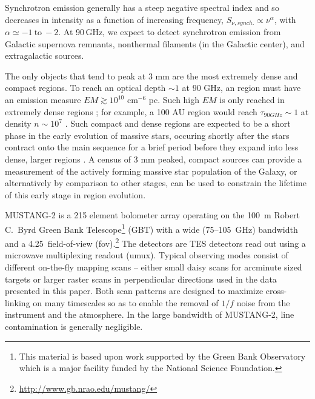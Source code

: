 \documentclass[twocolumn]{aastex62}
\newcommand{\MUSTANG}{MUSTANG-2\xspace}
\begin{document}
Synchrotron emission generally has a steep negative spectral index and so
decreases in intensity as a function of increasing frequency, $S_{\nu,
synch.}\propto \nu^{\alpha}$, with $\alpha\simeq -1 \mathrm{~to~} -2$.  At 90\,GHz, we expect
to detect synchrotron emission from Galactic supernova remnants, nonthermal
filaments (in the Galactic center), and extragalactic sources.

The only objects that tend to peak at 3 mm are the most extremely dense and
compact \hii regions.  To reach an optical depth $\sim1$ at 90 GHz, an \hii
region must have an emission measure $EM\gtrsim10^{10}$ cm$^{-6}$ pc.  Such high $EM$ is
only reached in extremely dense regions \citep[e.g.][]{Galvan-Madrid2009a}; for example, a 100 AU \hii region
would reach $\tau_{90 GHz}\sim1$ at density $n\sim10^7$ \percc
\citep[][]{Wilson2009a,Condon2016a}.  Such compact and dense \hii regions are
expected to be a short phase in the early evolution of massive stars, occuring
shortly after the stars contract onto the main sequence for a brief period
before they expand into less dense, larger \hii regions \citep{Wood1989b}.  A
census of 3 mm peaked, compact sources can provide a measurement of the
actively forming massive star population of the Galaxy, or alternatively by
comparison to other stages, can be used to constrain the lifetime of this early
stage in \hii region evolution.


\MUSTANG \citep{Dicker2014a} is a 215 element bolometer array operating on the
100~m Robert C.\ Byrd Green Bank Telescope\footnote{This material is
based upon work supported by the Green Bank Observatory which is a major
facility funded by the National Science Foundation.} (GBT) with a wide
(75--105~GHz) bandwidth and a 4.25\arcmin\ field-of-view
(fov).\footnote{\url{http://www.gb.nrao.edu/mustang/}}  The detectors are TES
detectors read out using a microwave multiplexing readout (umux). Typical
observing modes consist of different on-the-fly mapping scans -- either small
daisy scans for arcminute sized targets or larger raster scans in perpendicular
directions used in the data presented in this paper.  Both scan patterns are
designed to maximize cross-linking on many timescales so as to enable the
removal of $1/f$ noise from the instrument and the atmosphere.  In the large
bandwidth of \MUSTANG, line contamination is generally negligible.
\end{document}
